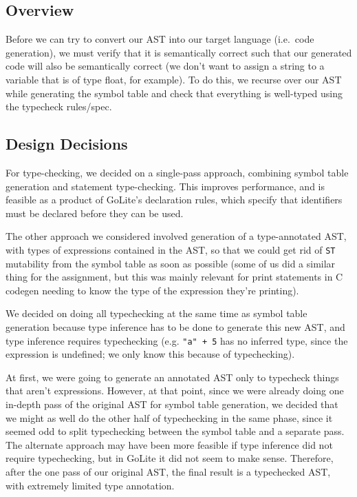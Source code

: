 \documentclass[11pt]{article}
\begin{document}
\subsection{Overview}
Before we can try to convert our AST into our target language (i.e.\
code generation), we must verify that it is semantically correct such
that our generated code will also be semantically correct (we don't
want to assign a string to a variable that is of type float, for
example). To do this, we recurse over our AST while generating the
symbol table and check that everything is well-typed using the
typecheck rules/spec\cite{golite-typecheck}.
\subsection{Design Decisions}
For type-checking, we decided on a single-pass approach, combining
symbol table generation and statement type-checking. This improves
performance, and is feasible as a product of GoLite's declaration
rules, which specify that identifiers must be declared before they can
be used.

The other approach we considered involved generation of a
type-annotated AST, with types of expressions contained in the AST, so
that we could get rid of \texttt{ST} mutability from the symbol table
as soon as possible (some of us did a similar thing for the
assignment, but this was mainly relevant for print statements in C
codegen needing to know the type of the expression they're printing).

We decided on doing all typechecking at the same time as symbol table
generation because type inference has to be done to generate this new
AST, and type inference requires typechecking (e.g. \texttt{"a" + 5}
has no inferred type, since the expression is undefined; we only know
this because of typechecking).

At first, we were going to generate an annotated AST only to typecheck
things that aren't expressions. However, at that point, since we were
already doing one in-depth pass of the original AST for symbol table
generation, we decided that we might as well do the other half of
typechecking in the same phase, since it seemed odd to split
typechecking between the symbol table and a separate pass. The
alternate approach may have been more feasible if type inference did
not require typechecking, but in GoLite it did not seem to make
sense. Therefore, after the one pass of our original AST, the final
result is a typechecked AST, with extremely limited type annotation.
\end{document}
